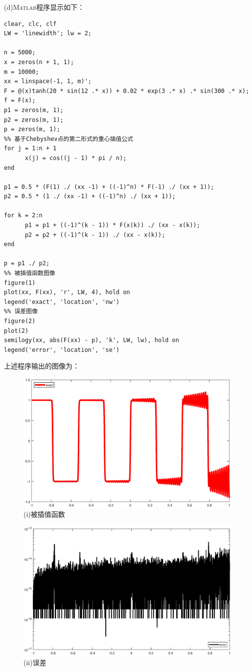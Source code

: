 \documentclass[12pt,a4paper,utf8]{ctexart}
\begin{document}
\begin{enumerate}
(d)\textsc{Matlab}程序显示如下：
\begin{lstlisting}[frame=single]
clear, clc, clf
LW = 'linewidth'; lw = 2;

n = 5000;
x = zeros(n + 1, 1);
m = 10000;
xx = linspace(-1, 1, m)';
F = @(x)tanh(20 * sin(12 .* x)) + 0.02 * exp(3 .* x) .* sin(300 .* x);
f = F(x);
p1 = zeros(m, 1);
p2 = zeros(m, 1);
p = zeros(m, 1);
%% 基于Chebyshev点的第二形式的重心插值公式
for j = 1:n + 1
      x(j) = cos((j - 1) * pi / n);
end

p1 = 0.5 * (F(1) ./ (xx -1) + ((-1)^n) * F(-1) ./ (xx + 1));
p2 = 0.5 * (1 ./ (xx -1) + ((-1)^n) ./ (xx + 1));

for k = 2:n
      p1 = p1 + ((-1)^(k - 1)) * F(x(k)) ./ (xx - x(k));
      p2 = p2 + ((-1)^(k - 1)) ./ (xx - x(k));
end

p = p1 ./ p2;
%% 被插值函数图像
figure(1)
plot(xx, F(xx), 'r', LW, 4), hold on
legend('exact', 'location', 'nw')
%% 误差图像
figure(2)
plot(2)
semilogy(xx, abs(F(xx) - p), 'k', LW, lw), hold on
legend('error', 'location', 'se')
\end{lstlisting}
上述程序输出的图像为：
\begin{figure}[H]
	\centering
	\includegraphics[width=1\textwidth]{p1d1.eps}
	\caption{(i)被插值函数}
\end{figure}

\begin{figure}[H]
	\centering
	\includegraphics[width=1\textwidth]{p1d2.eps}
	\caption{(ii)误差}
\end{figure}


\end{enumerate}
\end{document}
